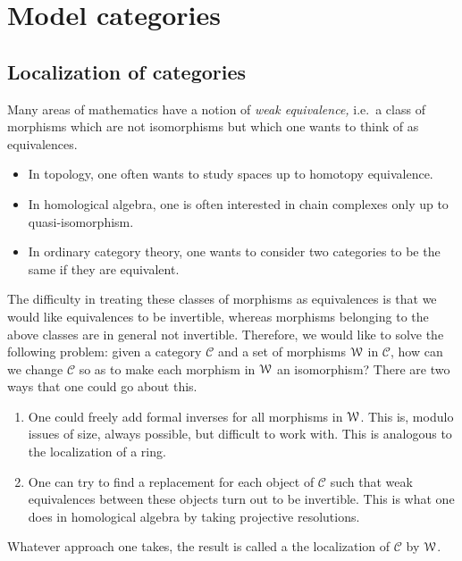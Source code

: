 \documentclass[main.tex]{subfiles}
\begin{document}
\chapter{Model categories}
\label{ch:model_categories}

\section{Localization of categories}
\label{sec:localization_of_categories}

Many areas of mathematics have a notion of \emph{weak equivalence,} i.e.\ a class of morphisms which are not isomorphisms but which one wants to think of as equivalences.
\begin{itemize}
  \item In topology, one often wants to study spaces up to homotopy equivalence.

  \item In homological algebra, one is often interested in chain complexes only up to quasi-isomorphism.

  \item In ordinary category theory, one wants to consider two categories to be the same if they are equivalent.
\end{itemize}

The difficulty in treating these classes of morphisms as equivalences is that we would like equivalences to be invertible, whereas morphisms belonging to the above classes are in general not invertible. Therefore, we would like to solve the following problem: given a category $\mathcal{C}$ and a set of morphisms $\mathcal{W}$ in $\mathcal{C}$, how can we change $\mathcal{C}$ so as to make each morphism in $\mathcal{W}$ an isomorphism? There are two ways that one could go about this.
\begin{enumerate}
  \item One could freely add formal inverses for all morphisms in $\mathcal{W}$. This is, modulo issues of size, always possible, but difficult to work with. This is analogous to the localization of a ring.

  \item One can try to find a replacement for each object of $\mathcal{C}$ such that weak equivalences between these objects turn out to be invertible. This is what one does in homological algebra by taking projective resolutions.
\end{enumerate}

Whatever approach one takes, the result is called a the localization of $\mathcal{C}$ by $\mathcal{W}$.
\end{document}
